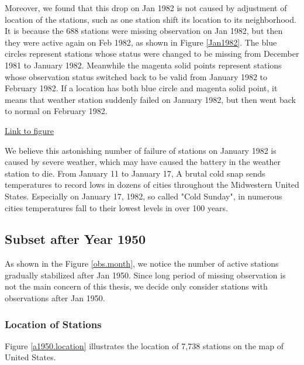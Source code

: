 Moreover, we found that this drop on Jan 1982 is not caused by adjustment of 
location of the stations, such as one station shift its location to its 
neighborhood. It is because the 688 stations were missing observation on Jan 
1982, but then they were active again on Feb 1982, as shown in Figure 
\href{../plots/obs_Jan1982.pdf}{\ref*{Jan1982}}. The blue circles represent 
stations whose status were changed to be missing from December 1981
to January 1982. Meanwhile the magenta solid points represent stations whose
observation status switched back to be valid from January 1982 to February 1982.
If a location has both blue circle and magenta solid point, it means that weather 
station suddenly failed on January 1982, but then went back to normal on 
February 1982. 

\begin{framed}
\begin{center}
  \href{../plots/obs_Jan1982.pdf}{Link to figure}
  \label{Jan1982}
\end{center}
\end{framed}

We believe this astonishing number of failure of stations on January 1982 is caused
by severe weather, which may have caused the battery in the weather station to 
die. From January 11 to January 17, A brutal cold snap sends temperatures to 
record lows in dozens of cities throughout the Midwestern United States.
Especially on January 17, 1982, so called "Cold Sunday"\cite{coldsunday}, in 
numerous cities temperatures fall to their lowest levels in over 100 years.

\subsection{Subset after Year 1950}

As shown in the Figure \href{../plots/obs_month.pdf}{\ref*{obs.month}}, we notice
the number of active stations gradually stabilized after Jan 1950. Since long
period of missing observation is not the main concern of this thesis, we decide
only consider stations with observations after Jan 1950.

\subsubsection{Location of Stations}

Figure \href{../plots/a1950stations.pdf}{\ref*{a1950.location}} illustrates the 
location of 7,738 stations on the map of United States.


